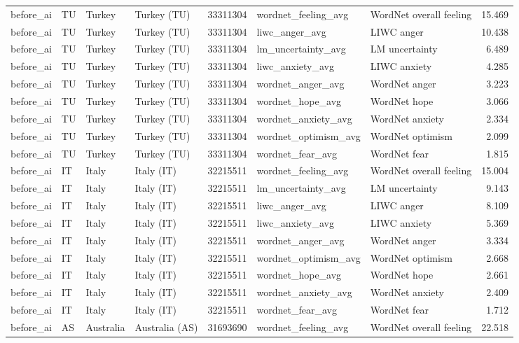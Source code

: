 \begin{tabular}{llllrllr}
before\_ai & TU & Turkey & Turkey (TU) & 33311304 & wordnet\_feeling\_avg & WordNet overall feeling & 15.469 \\
before\_ai & TU & Turkey & Turkey (TU) & 33311304 & liwc\_anger\_avg & LIWC anger & 10.438 \\
before\_ai & TU & Turkey & Turkey (TU) & 33311304 & lm\_uncertainty\_avg & LM uncertainty & 6.489 \\
before\_ai & TU & Turkey & Turkey (TU) & 33311304 & liwc\_anxiety\_avg & LIWC anxiety & 4.285 \\
before\_ai & TU & Turkey & Turkey (TU) & 33311304 & wordnet\_anger\_avg & WordNet anger & 3.223 \\
before\_ai & TU & Turkey & Turkey (TU) & 33311304 & wordnet\_hope\_avg & WordNet hope & 3.066 \\
before\_ai & TU & Turkey & Turkey (TU) & 33311304 & wordnet\_anxiety\_avg & WordNet anxiety & 2.334 \\
before\_ai & TU & Turkey & Turkey (TU) & 33311304 & wordnet\_optimism\_avg & WordNet optimism & 2.099 \\
before\_ai & TU & Turkey & Turkey (TU) & 33311304 & wordnet\_fear\_avg & WordNet fear & 1.815 \\
before\_ai & IT & Italy & Italy (IT) & 32215511 & wordnet\_feeling\_avg & WordNet overall feeling & 15.004 \\
before\_ai & IT & Italy & Italy (IT) & 32215511 & lm\_uncertainty\_avg & LM uncertainty & 9.143 \\
before\_ai & IT & Italy & Italy (IT) & 32215511 & liwc\_anger\_avg & LIWC anger & 8.109 \\
before\_ai & IT & Italy & Italy (IT) & 32215511 & liwc\_anxiety\_avg & LIWC anxiety & 5.369 \\
before\_ai & IT & Italy & Italy (IT) & 32215511 & wordnet\_anger\_avg & WordNet anger & 3.334 \\
before\_ai & IT & Italy & Italy (IT) & 32215511 & wordnet\_optimism\_avg & WordNet optimism & 2.668 \\
before\_ai & IT & Italy & Italy (IT) & 32215511 & wordnet\_hope\_avg & WordNet hope & 2.661 \\
before\_ai & IT & Italy & Italy (IT) & 32215511 & wordnet\_anxiety\_avg & WordNet anxiety & 2.409 \\
before\_ai & IT & Italy & Italy (IT) & 32215511 & wordnet\_fear\_avg & WordNet fear & 1.712 \\
before\_ai & AS & Australia & Australia (AS) & 31693690 & wordnet\_feeling\_avg & WordNet overall feeling & 22.518 \\

\end{tabular}
